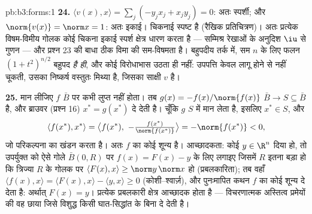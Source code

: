\begin{solution}{pb:b3:forms:1}
\textbf{24.} $\langle v(x), x\rangle = \sum_j(-y_jx_j +
x_jy_j) = 0$: अतः स्पर्शी; और $\norm{v(x)} = \norm x = 1$:
अतः इकाई। चिकनाई स्पष्ट है (रैखिक प्रतिचित्रण)। अतः प्रत्येक
विषम-विमीय गोलक कोई चिकना इकाई स्पर्श क्षेत्र धारण करता है
--- सम्मिश्र रेखाओं के अनुदिश $\iu$ से गुणन --- और प्रश्न 23
की बाधा ठीक विमा की सम-विषमता है। बहुपदीय तर्क में, सम $n$
के लिए फलन $(1 +
t^2)^{n/2}$ बहुपद \emph{है ही}, और कोई विरोधाभास उठता ही
नहीं: उपपत्ति केवल लागू होने से नहीं चूकती, उसका निष्कर्ष
वस्तुतः मिथ्या है, जिसका साक्षी $v$ है।

\textbf{25.} मान लीजिए $f$ $\bar B$ पर कभी लुप्त नहीं होता।
तब $g(x) = -f(x)/\norm{f(x)}$  $\bar B \to S
\subseteq \bar B$ है, और ब्राउवर (प्रश्न 16) $x^* =
g(x^*)$ दे देती है। चूँकि $g$ $S$ में मान लेता है, इसलिए
$x^* \in S$, और
\[
\langle f(x^*), x^*\rangle = \bigl\langle f(x^*),\
-\tfrac{f(x^*)}{\norm{f(x^*)}}\bigr\rangle
= -\norm{f(x^*)} < 0,
\]
जो  परिकल्पना का खंडन करता है। अतः $f$ का कोई शून्य
है। आच्छादकता: कोई $y \in \R^n$ दिया हो, तो उपर्युक्त को
ऐसे गोले $\bar B(0, R)$ पर $f(x) =
F(x) - y$ के लिए लगाइए जिसमें $R$ इतना बड़ा हो कि त्रिज्या
$R$ के गोलक पर $\langle F(x), x\rangle \geq \norm y\,\norm x$
हो (प्रबलकारिता); तब वहाँ $\langle f(x), x\rangle =
\langle F(x), x\rangle - \langle y, x\rangle \geq 0$
(कोशी--श्वार्ज़), और पुनःमापित कथन $f$ का कोई शून्य दे देता
है: अर्थात् $F(x) = y$। प्रत्येक प्रबलकारी  क्षेत्र
आच्छादक होता है --- विचरणात्मक अस्तित्व प्रमेयों की वह छाया
जिसे विशुद्ध  किसी घात-सिद्धांत के बिना दे देती है।
\end{solution}
